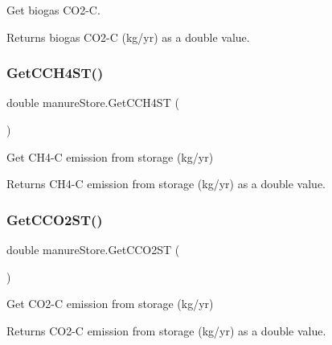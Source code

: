 Get biogas C\+O2-\/C. 

\begin{DoxyReturn}{Returns}
biogas C\+O2-\/C (kg/yr) as a double value. 
\end{DoxyReturn}
\mbox{\label{classmanure_store_aee4bfa3be452102d08a826e07e396ac5}} 
\subsubsection{\texorpdfstring{GetCCH4ST()}{GetCCH4ST()}}
{\footnotesize\ttfamily double manure\+Store.\+Get\+C\+C\+H4\+ST (\begin{DoxyParamCaption}{ }\end{DoxyParamCaption})\hspace{0.3cm}{\ttfamily [inline]}}



Get C\+H4-\/C emission from storage (kg/yr) 

\begin{DoxyReturn}{Returns}
C\+H4-\/C emission from storage (kg/yr) as a double value. 
\end{DoxyReturn}
\mbox{\label{classmanure_store_a33e4a1b2f4613fcfaa3b6f874acab8b4}} 
\subsubsection{\texorpdfstring{GetCCO2ST()}{GetCCO2ST()}}
{\footnotesize\ttfamily double manure\+Store.\+Get\+C\+C\+O2\+ST (\begin{DoxyParamCaption}{ }\end{DoxyParamCaption})\hspace{0.3cm}{\ttfamily [inline]}}



Get C\+O2-\/C emission from storage (kg/yr) 

\begin{DoxyReturn}{Returns}
C\+O2-\/C emission from storage (kg/yr) as a double value. 
\end{DoxyReturn}
\mbox{\label{classmanure_store_afb0124e830306d9f1bb66b11fc6df6b0}} 
